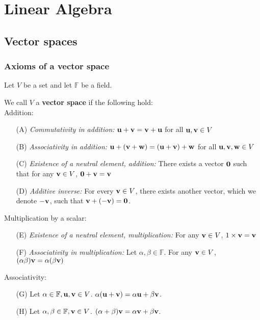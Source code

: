 \documentclass{article}
\begin{document}
\section{Linear Algebra}

\subsection{Vector spaces}
\subsubsection{Axioms of a vector space}
Let $V$ be a set and let $\mathbb{F}$ be a field.

\begin{definition}
\label{def:vec_space}
We call $V$ a \textbf{vector space} if the following hold: \\
Addition:
\begin{enumerate}
\setlength\itemsep{0.1em}
    \item[(A)] \textit{Commutativity in addition:} ${\mathbf{u}} + {\mathbf{v}} = {\mathbf{v}} + {\mathbf{u}}$ for all ${\mathbf{u}}, {\mathbf{v}} \in V$
    \item[(B)] \textit{Associativity in addition:} ${\mathbf{u}} + ({\mathbf{v}} + {\mathbf{w}}) = ({\mathbf{u}} + {\mathbf{v}}) + {\mathbf{w}}$ for all ${\mathbf{u}}, {\mathbf{v}}, {\mathbf{w}} \in V$
    \item[(C)] \textit{Existence of a neutral element, addition:} There exists a vector ${\mathbf{0}}$ such that for any ${\mathbf{v}} \in V$, ${\mathbf{0}} + {\mathbf{v}} = {\mathbf{v}}$
    \item[(D)] \textit{Additive inverse:} For every ${\mathbf{v}} \in V$, there exists another vector, which we denote $-{\mathbf{v}}$, such that ${\mathbf{v}} + (-{\mathbf{v}}) = {\mathbf{0}}$.
\end{enumerate}

Multiplication by a scalar:

\begin{enumerate}
\setlength\itemsep{0.1em}
    \item[(E)] \textit{Existence of a neutral element, multiplication:} For any ${\mathbf{v}} \in V$, $1\times {\mathbf{v}} = {\mathbf{v}}$
    \item[(F)] \textit{Associativity in multiplication:} Let $\alpha, \beta \in \mathbb{F}$. For any ${\mathbf{v}} \in V$, $(\alpha \beta) {\mathbf{v}} = \alpha (\beta {\mathbf{v}})$ 
\end{enumerate}

Associativity:
\begin{enumerate}
\setlength\itemsep{0.1em}
    \item[(G)] Let $\alpha \in \mathbb{F}, {\mathbf{u}}, {\mathbf{v}} \in V$. $\alpha ({\mathbf{u}} + {\mathbf{v}}) = \alpha {\mathbf{u}} + \beta {\mathbf{v}}$.
    \item[(H)] Let $\alpha, \beta \in \mathbb{F}, {\mathbf{v}} \in V$. $(\alpha + \beta) {\mathbf{v}} = \alpha {\mathbf{v}} + \beta {\mathbf{v}}$.
\end{enumerate}
\end{definition}
\end{document}
